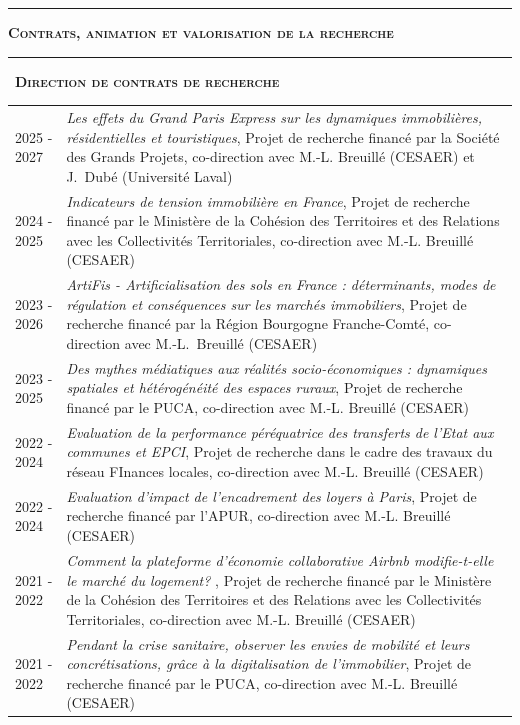 \documentclass[a4paper,12pt]{article}
\newcommand{\titre}[1]{%
	\bigskip
	\noindent \rule[2mm]{\textwidth}{0.5pt}
	\textbf{\textsc{\large #1}} \\
	\noindent \rule[1mm]{\textwidth}{0.5pt}
	}
\newcommand{\smalltitre}[1]{%
	\noindent \textbullet~\textsc{\textbf{#1}}
	\smallskip
	}
\begin{document}
\newpage

\titre{Contrats, animation et valorisation de la recherche}

\smalltitre{Direction de contrats de recherche}

\noindent \begin{longtable}{@{}p{\annee}p{\texte}@{}}

2025 - 2027 & \og{}\textit{Les effets du Grand Paris Express sur les dynamiques immobilières, résidentielles et touristiques}\fg{}, Projet de recherche financé par la Société des Grands Projets, co-direction avec M.-L. Breuillé (CESAER) et J.~Dubé (Université Laval) \\
2024 - 2025 & \og{}\textit{Indicateurs de tension immobilière en France}\fg{}, Projet de recherche financé par le Ministère de la Cohésion des Territoires et des Relations avec les Collectivités Territoriales, co-direction avec M.-L. Breuillé (CESAER) \\
2023 - 2026 & \og{}\textit{ArtiFis - Artificialisation des sols en France : déterminants, modes de régulation et conséquences sur les marchés immobiliers}\fg{}, Projet de recherche financé par la Région Bourgogne Franche-Comté, co-direction avec M.-L.~Breuillé (CESAER) \\
2023 - 2025 & \og{}\textit{Des mythes médiatiques aux réalités socio-économiques : dynamiques spatiales et hétérogénéité des espaces ruraux}\fg{}, Projet de recherche financé par le PUCA, co-direction avec M.-L. Breuillé (CESAER) \\
2022 - 2024 & \og{}\textit{Evaluation de la performance péréquatrice des transferts de l'Etat aux communes et EPCI}\fg{}, Projet de recherche dans le cadre des travaux du réseau FInances locales, co-direction avec M.-L. Breuillé (CESAER) \\
2022 - 2024 & \og{}\textit{Evaluation d'impact de l'encadrement des loyers à Paris}\fg{}, Projet de recherche financé par l'APUR, co-direction avec M.-L. Breuillé (CESAER) \\
2021 - 2022 & \og{}\textit{Comment la plateforme d'économie collaborative Airbnb modifie-t-elle le marché du logement? }\fg{}, Projet de recherche financé par le Ministère de la Cohésion des Territoires et des Relations avec les Collectivités Territoriales, co-direction avec M.-L. Breuillé (CESAER) \\
2021 - 2022 & \og{}\textit{Pendant la crise sanitaire, observer les envies de mobilité et leurs concrétisations, grâce à la digitalisation de l'immobilier}\fg{}, Projet de recherche financé par le PUCA, co-direction avec M.-L. Breuillé (CESAER) \\

\end{longtable}
\end{document}
